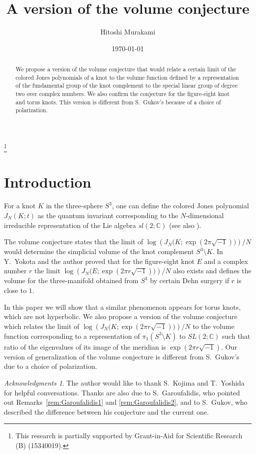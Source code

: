 \documentclass[a4paper]{amsart}
\theoremstyle{plain}
\theoremstyle{definition}
\theoremstyle{remark}
\newtheorem*{ack}{Acknowledgments}
\newcommand{\C}{\mathbb{C}}
\numberwithin{equation}{section}
\begin{document}
\title
{A version of the volume conjecture}
\author{Hitoshi Murakami}
\address{
Department of Mathematics,
Tokyo Institute of Technology,
Oh-okayama, Meguro, Tokyo 152-8551, Japan
}
\date{\today}
\begin{abstract}
We propose a version of the volume conjecture that would relate a certain limit of the colored Jones polynomials of a knot to the volume function defined by a representation of the fundamental group of the knot complement to the special linear group of degree two over complex numbers.
We also confirm the conjecture for the figure-eight knot and torus knots.
This version is different from S.~Gukov's because of a choice of polarization.
\end{abstract}
\thanks{This research is partially supported by Grant-in-Aid for Scientific
Research (B) (15340019).}
\maketitle
\section{Introduction}
For a knot $K$ in the three-sphere $S^3$, one can define the colored Jones polynomial $J_N(K;t)$ as the quantum invariant corresponding to the $N$-dimensional irreducible representation of the Lie algebra $sl(2;\C)$
\cite{Jones:BULAM385,Kirillov/Reshetikhin:1989}
(see also \cite{Kirby/Melvin:INVEM1991}).
\par
The volume conjecture \cite{Kashaev:LETMP97,Murakami/Murakami:ACTAM12001} states that the limit of
$\log\left(J_N\bigl(K;\exp(2\pi\sqrt{-1})\bigr)\right)/N$ would determine the simplicial volume of the knot complement $S^3\setminus{K}$.
In \cite{Murakami/Yokota:JREIA} Y.~Yokota and the author proved that for the figure-eight knot $E$ and a complex number $r$ the limit
$\log\left(J_N\bigl(E;\exp(2\pi{r}\sqrt{-1})\bigr)\right)/N$ also exists and defines the volume for the three-manifold obtained from $S^3$ by certain Dehn surgery if $r$ is close to $1$.
\par
In this paper we will show that a similar phenomenon appears for torus knots, which are not hyperbolic.
We also propose a version of the volume conjecture which relates the limit of
$\log\left(J_N\bigl(K;\exp(2\pi{r}\sqrt{-1})\bigr)\right)/N$ to the volume function corresponding to a representation of $\pi_1(S^3\setminus{K})$ to
$SL(2;\C)$ such that ratio of the eigenvalues of its image of the meridian is
$\exp\left(2\pi{r}\sqrt{-1}\right)$.
Our version of generalization of the volume conjecture is different from S.~Gukov's \cite{Gukov:COMMP2005} due to a choice of polarization.
\begin{ack}
The author would like to thank S.~Kojima and T.~Yoshida for helpful conversations.
Thanks are also due to S.~Garoufalidis, who pointed out
Remarks~\ref{rem:Garoufalidis1} and \ref{rem:Garoufalidis2}, and to S.~Gukov,
who described the difference between his conjecture and the current one.
\end{ack}
\end{document}
